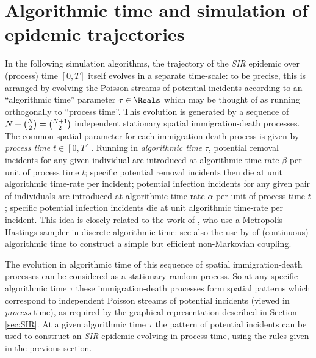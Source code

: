 \documentclass[]{article}
\newcommand{\Population}{N}
\newcommand{\SIR}{\emph{SIR}\xspace}
\begin{document}
 \section{Algorithmic time and simulation of epidemic trajectories}\label{sec:algorithmic}
%
In the following simulation algorithms,
the trajectory of the \SIR epidemic over (process) time \([0,T]\)
itself evolves in a separate time-scale:
to be precise, this is arranged by evolving
the Poisson streams of potential incidents 
according
 to an ``algorithmic time'' parameter \(\tau\in\Reals\)
 which may be thought of as running orthogonally to ``process time''.
 This evolution is generated by
 a sequence of
 \(\Population+\tbinom{\Population}{2}=\tbinom{\Population+1}{2}\) 
 independent stationary 
 spatial immigration-death processes.
 The common spatial parameter for
 each immigration-death process
 is given by  \emph{process time} \(t\in[0,T]\).
 Running in 
 \emph{algorithmic
 time} \(\tau\), potential removal incidents for any given individual 
 are introduced at algorithmic time-rate \(\beta\) per unit of process time \(t\);
specific potential removal incidents then die at unit algorithmic time-rate per incident;
 potential infection incidents for any given pair of individuals are introduced 
 at algorithmic time-rate \(\alpha\) per unit of process time \(t\); 
specific potential infection incidents die at unit algorithmic time-rate per incident.%
This idea is closely related to the work of 
\citet{GibsonRenshaw-1998,GibsonRenshaw-2001}, who use a Metropolis-Hastings sampler
in discrete algorithmic time:
see also the use
by \cite{BanerjeeKendall-2015}
of (continuous) algorithmic time 
to construct a simple but 
 efficient non-Markovian coupling.%
 
 The evolution in algorithmic time of this
 sequence of
 spatial immigration-death processes can be considered as
a stationary random process. 
 So at any specific algorithmic time \(\tau\)
 these immigration-death processes form spatial patterns which correspond to
 independent Poisson streams of potential incidents (viewed in \emph{process} time),
 as required by the graphical representation described in 
 Section \ref{sec:SIR}.
At a given algorithmic time \(\tau\) 
the pattern of potential incidents 
can be used to construct an \SIR epidemic 
evolving in process time, using the rules given in the previous section.
\end{document}

